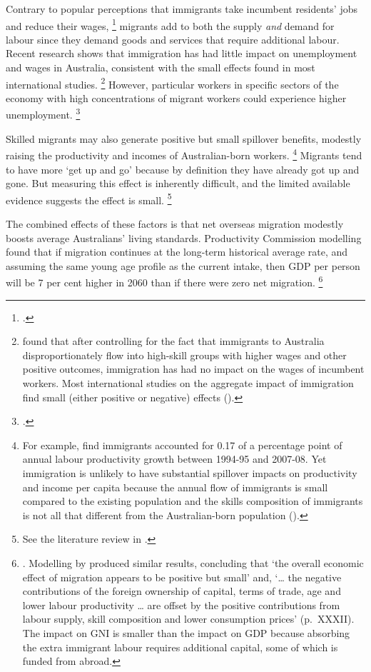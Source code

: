 Contrary to popular perceptions that immigrants take incumbent residents' jobs and reduce their wages,%
    \footcite{Abbott_2018_sydney_institute_immigration}
migrants add to both the supply \emph{and} demand for labour since they demand goods and services that require additional labour.
Recent research shows that immigration has had little impact on unemployment and wages in Australia, consistent with the small effects found in most international studies.%
	\footnote{\textcite{BreunigEtAl2016Immigration} found that after controlling for the fact that immigrants to Australia disproportionately flow into high-skill groups with higher wages and other positive outcomes, immigration has had no impact on the wages of incumbent workers.
    Most international studies on the aggregate impact of immigration find small (either positive or negative) effects (\textcite[][9]{CommissionMigrantIntake2016}).}
However, particular workers in specific sectors of the economy with high concentrations of migrant workers could experience higher unemployment.%
	\footcite[][195]{CommissionMigrantIntake2016}

Skilled migrants may also generate positive but small spillover benefits, modestly raising the productivity and incomes of Australian-born workers.%
	\footnote{For example, \textcite{Parham-etal-2015-Migration-productivity-Aust} find immigrants accounted for 0.17 of a percentage point of annual labour productivity growth between 1994-95 and 2007-08.
	Yet immigration is unlikely to have substantial spillover impacts on productivity and income per capita because the annual flow of immigrants is small compared to the existing population and the skills composition of immigrants is not all that different from the Australian-born population (\textcite[][214]{CommissionMigrantIntake2016}).}
Migrants tend to have more `get up and go' because by definition they have already got up and gone.
But measuring this effect is inherently difficult, and the limited available evidence suggests the effect is small.%
	\footnote{See the literature review in \textcite[][212--214]{CommissionMigrantIntake2016}.}

The combined effects of these factors is that net overseas migration modestly boosts average Australians' living standards.
Productivity Commission modelling found that if migration continues at the long-term historical average rate, and assuming the same young age profile as the current intake, then GDP per person will be 7 per cent higher in 2060 than if there were zero net migration.%
	\footnote{\textcite[][15]{CommissionMigrantIntake2016}.
	Modelling by \textcite{PC-2006-Econ-Impacts-of-Migration-Pop-growth} produced similar results, concluding that `the overall economic effect of migration appears to be positive but small' and, `\dots{} the negative contributions of the foreign ownership of capital, terms of trade, age and lower labour productivity \dots{} are offset by the positive contributions from labour supply, skill composition and lower consumption prices' (p.~XXXII).
	The impact on GNI is smaller than the impact on GDP because absorbing the extra immigrant labour requires additional capital, some of which is funded from abroad.}


